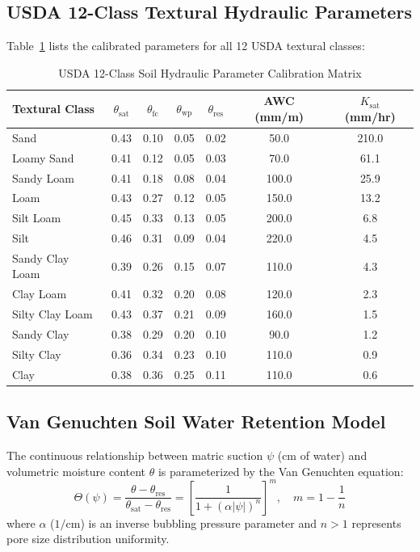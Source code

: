 \documentclass[11pt,a4paper]{article}
\theoremstyle{definition}
\theoremstyle{remark}
\begin{document}
\subsection{USDA 12-Class Textural Hydraulic Parameters}
Table~\ref{tab:usda_textures} lists the calibrated parameters for all 12 USDA textural classes:

\begin{table}[htbp]
\centering
\caption{USDA 12-Class Soil Hydraulic Parameter Calibration Matrix}
\label{tab:usda_textures}
\small
\begin{tabular}{lcccccc}
\toprule
\textbf{Textural Class} & $\theta_{\text{sat}}$ & $\theta_{\text{fc}}$ & $\theta_{\text{wp}}$ & $\theta_{\text{res}}$ & \textbf{AWC} (mm/m) & $K_{\text{sat}}$ (mm/hr) \\
\midrule
Sand                & 0.43 & 0.10 & 0.05 & 0.02 & 50.0  & 210.0 \\
Loamy Sand          & 0.41 & 0.12 & 0.05 & 0.03 & 70.0  & 61.1 \\
Sandy Loam          & 0.41 & 0.18 & 0.08 & 0.04 & 100.0 & 25.9 \\
Loam                & 0.43 & 0.27 & 0.12 & 0.05 & 150.0 & 13.2 \\
Silt Loam           & 0.45 & 0.33 & 0.13 & 0.05 & 200.0 & 6.8 \\
Silt                & 0.46 & 0.31 & 0.09 & 0.04 & 220.0 & 4.5 \\
Sandy Clay Loam     & 0.39 & 0.26 & 0.15 & 0.07 & 110.0 & 4.3 \\
Clay Loam           & 0.41 & 0.32 & 0.20 & 0.08 & 120.0 & 2.3 \\
Silty Clay Loam     & 0.43 & 0.37 & 0.21 & 0.09 & 160.0 & 1.5 \\
Sandy Clay          & 0.38 & 0.29 & 0.20 & 0.10 & 90.0  & 1.2 \\
Silty Clay          & 0.36 & 0.34 & 0.23 & 0.10 & 110.0 & 0.9 \\
Clay                & 0.38 & 0.36 & 0.25 & 0.11 & 110.0 & 0.6 \\
\bottomrule
\end{tabular}
\end{table}

\subsection{Van Genuchten Soil Water Retention Model}
The continuous relationship between matric suction $\psi$ (cm of water) and volumetric moisture content $\theta$ is parameterized by the Van Genuchten equation:
\begin{equation}
    \Theta(\psi) = \frac{\theta - \theta_{\text{res}}}{\theta_{\text{sat}} - \theta_{\text{res}}} = \left[ \frac{1}{1 + (\alpha |\psi|)^n} \right]^m, \quad m = 1 - \frac{1}{n}
\end{equation}
where $\alpha$ ($1/\text{cm}$) is an inverse bubbling pressure parameter and $n > 1$ represents pore size distribution uniformity.
\end{document}

